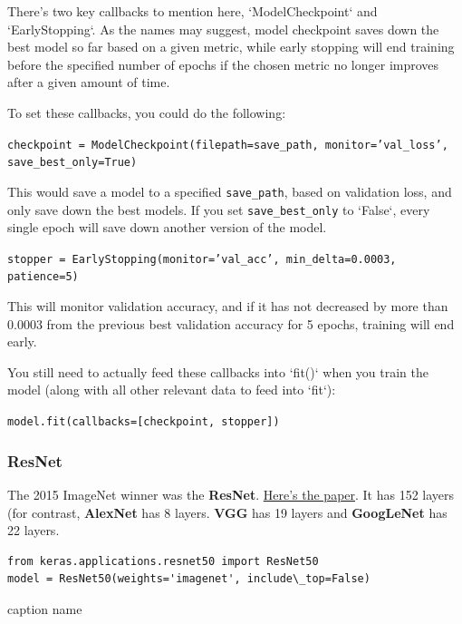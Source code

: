 \documentclass[11pt, a4paper]{article}
\begin{document}
There's two key callbacks to mention here, `ModelCheckpoint` and `EarlyStopping`. As the names may suggest, model checkpoint saves down the best model so far based on a given metric, while early stopping will end training before the specified number of epochs if the chosen metric no longer improves after a given amount of time.

To set these callbacks, you could do the following:

\texttt{checkpoint = ModelCheckpoint(filepath=save\_path, 
monitor='val\_loss', save\_best\_only=True)}



This would save a model to a specified \texttt{save\_path}, based on validation loss, and only save down the best models. If you set \texttt{save\_best\_only} to `False`, every single epoch will save down another version of the model.


\texttt{stopper = EarlyStopping(monitor='val\_acc', min\_delta=0.0003, patience=5)}


This will monitor validation accuracy, and if it has not decreased by more than 0.0003 from the previous best validation accuracy for 5 epochs, training will end early.


You still need to actually feed these callbacks into `fit()` when you train the model (along with all other relevant data to feed into `fit`):

\texttt{model.fit(callbacks=[checkpoint, stopper])}










\subsubsection{ResNet}%
\label{ssub:resnet}

The 2015 ImageNet winner was the \textbf{ResNet}. \href{https://arxiv.org/pdf/1512.03385.pdf}{Here's the paper}. It has 152 layers (for contrast, \textbf{AlexNet} has 8 layers. \textbf{VGG} has 19 layers and \textbf{GoogLeNet} has 22 layers. 


\begin{listing}
\begin{verbatim}
from keras.applications.resnet50 import ResNet50
model = ResNet50(weights='imagenet', include\_top=False)
\end{verbatim}
\caption{caption name}
\label{lst:caption_name}
\end{listing}
\end{document}
